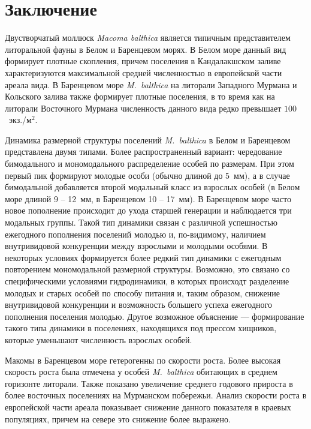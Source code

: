 	\chapter*{Заключение}		

Двустворчатый моллюск \textit{Macoma balthica} является типичным представителем литоральной фауны в Белом и Баренцевом морях. 
В Белом море данный вид формирует плотные скопления, причем поселения в Кандалакшском заливе характеризуются максимальной средней численностью в европейской части ареала вида.
В Баренцевом море \textit{M.~balthica} на литорали Западного Мурмана и Кольского залива также формирует плотные поселения, в то время как на литорали Восточного Мурмана численность данного вида редко превышает $100$~экз./м$^2$.

Динамика размерной структуры поселений {\it M.~balthica} в Белом и Баренцевом представлена двумя типами.
Более распространенный вариант: чередование бимодального и мономодального распределение особей по размерам. 
При этом первый пик формируют молодые особи (обычно длиной до 5~мм), а в случае бимодальной добавляется второй модальный класс из взрослых особей (в Белом море длиной 9 -- 12~мм, в Баренцевом 10 -- 17~мм). 
В Баренцевом море часто новое пополнение происходит до ухода старшей генерации и наблюдается три модальных группы. 
Такой тип динамики связан с различной успешностью ежегодного пополнения поселений молодью и, по-видимому, наличием внутривидовой конкуренции между взрослыми и молодыми особями.
В некоторых условиях формируется более редкий тип динамики с ежегодным повторением мономодальной размерной структуры. 
Возможно, это связано со специфическими условиями гидродинамики, в которых происходт разделение молодых и старых особей по способу питания и, таким образом, снижение внутривидовой конкуренции и возможность большего успеха ежегодного пополнения поселения молодью. 
Другое возможное объяснение --- формирование такого типа динамики в поселениях, находящихся под прессом хищников, которые уменьшают численность взрослых особей.

Макомы в Баренцевом море гетерогенны по скорости роста. 
Более высокая скорость роста была отмечена у особей {\it M.~balthica} обитающих в среднем горизонте литорали.
Также показано увеличение среднего годового прироста в более восточных поселениях на Мурманском побережьи.
Анализ скорости роста в европейской части ареала показывает снижение данного показателя в краевых популяциях, причем на севере это снижение более выражено.

